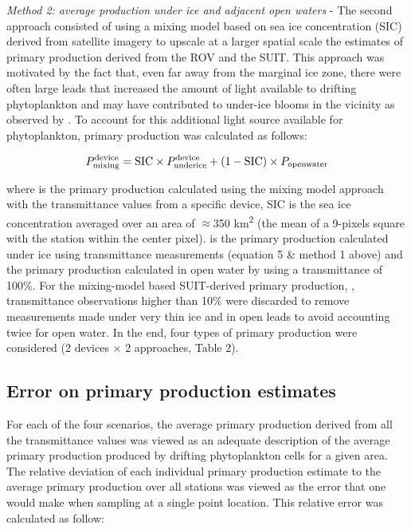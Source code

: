 \textit{Method 2: average production under ice and adjacent open waters} - The second approach consisted of using a mixing model based on sea ice concentration (SIC) derived from satellite imagery to upscale at a larger spatial scale the estimates of primary production derived from the ROV and the SUIT. This approach was motivated by the fact that, even far away from the marginal ice zone, there were often large leads that increased the amount of light available to drifting phytoplankton and may have contributed to under-ice blooms in the vicinity as observed by \citet{Assmy2017}. To account for this additional light source available for phytoplankton, primary production was calculated as follows:

\begin{linenomath*}
    \begin{equation}
		\ppmixingdevice{} = \text{SIC} \times \ppundericedevice{} + (1 - \text{SIC}) \times \ppopenwater{}
	\end{equation}
\end{linenomath*}

where \ppmixingdevice{} is the primary production calculated using the mixing model approach with the transmittance values from a specific device, SIC is the sea ice concentration averaged over an area of $\approx$350 km\textsuperscript{2} (the mean of a 9-pixels square with the station within the center pixel). \ppundericedevice{} is the primary production calculated under ice using transmittance measurements (equation 5 \& method 1 above) and \ppopenwater{} the primary production calculated in open water by using a transmittance of 100\%. For the mixing-model based SUIT-derived primary production, \ppmixingsuit{}, transmittance observations higher than 10\% were discarded to remove measurements made under very thin ice and in open leads to avoid accounting twice for open water. In the end, four types of primary production were considered (2 devices $\times$ 2 approaches, Table 2).

\subsection{Error on primary production estimates}

For each of the four scenarios, the average primary production derived from all the transmittance values was viewed as an adequate description of the average primary production produced by drifting phytoplankton cells for a given area. The relative deviation of each individual primary production estimate to the average primary production over all stations was viewed as the error that one would make when sampling at a single point location. This relative error was calculated as follow:

